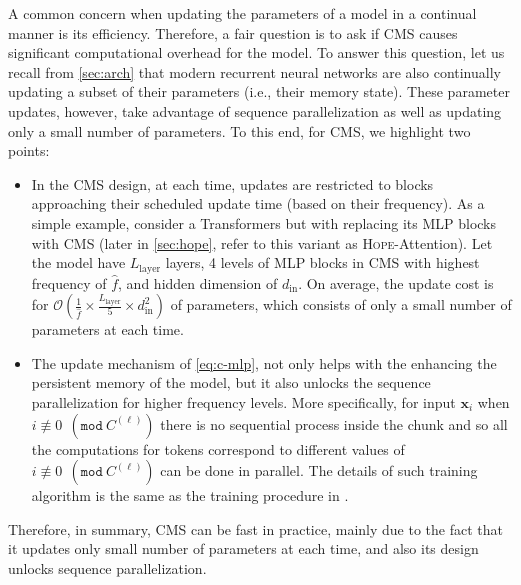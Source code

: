 \documentclass{article}
\newcommand{\citet}{\textcite}
\newcommand{\headdot}[1]{\vspace{1.7mm}\noindent{{\textcolor{c4}{\bf #1}}}}
\newcommand{\model}[0]{\textsc{Hope}}
\newcommand{\vx}{\boldsymbol{x}}
\begin{document}
{\headdot{Is CMS Efficient Enough?}\label{sec:training-cmlp}
A common concern when updating the parameters of a model in a continual manner is its efficiency. Therefore, a fair question is to ask if CMS causes significant computational overhead for the model. To answer this question, let us recall from \autoref{sec:arch} that modern recurrent neural networks are also continually updating a subset of their parameters (i.e., their memory state). These parameter updates, however, take advantage of sequence parallelization as well as updating only a small number of parameters. To this end, for CMS, we highlight two points: 
\begin{itemize}
    \item In the CMS design, at each time, updates are restricted to blocks approaching their scheduled update time (based on their frequency). As a simple example, consider a Transformers but with replacing its MLP blocks with CMS (later in \autoref{sec:hope}, refer to this variant as \model-Attention). Let the model have $L_{\text{layer}}$ layers, 4 levels of MLP blocks in CMS with highest frequency of $\hat{f}$, and hidden dimension of $d_{\text{in}}$. On average, the update cost is for $\mathcal{O}\left(\frac{1}{\hat{f}} \times \frac{L_{\text{layer}}}{5} \times d_{\text{in}}^2 \right)$ of parameters, which consists of only a small number of parameters at each time. 
    \item The update mechanism of \autoref{eq:c-mlp}, not only helps with the enhancing the persistent memory of the model, but it also unlocks the sequence parallelization for higher frequency levels. More specifically, for input $\vx_i$ when $i \nequiv 0 \:\: (\texttt{mod} \: C^{(\ell)})$ there is no sequential process inside the chunk and so all the computations for tokens correspond to different values of $i \nequiv 0 \:\: (\texttt{mod} \: C^{(\ell)})$ can be done in parallel. The details of such training algorithm is the same as the training procedure in \citet{sun2024learning, behrouz2024titans}.
\end{itemize}
Therefore, in summary, CMS can be fast in practice, mainly due to the fact that it updates only small number of parameters at each time, and also its design unlocks sequence parallelization.  

}
\end{document}
